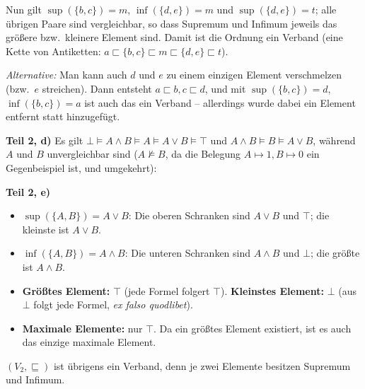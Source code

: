 \begin{loesung}
Nun gilt $\sup(\{b,c\})=m$, $\inf(\{d,e\})=m$ und $\sup(\{d,e\})=t$; alle übrigen Paare sind vergleichbar, so dass Supremum und Infimum jeweils das größere bzw.\ kleinere Element sind. Damit ist die Ordnung ein Verband (eine Kette von Antiketten: $a \sqsubset \{b,c\} \sqsubset m \sqsubset \{d,e\} \sqsubset t$).

\textit{Alternative:} Man kann auch $d$ und $e$ zu einem einzigen Element verschmelzen (bzw.\ $e$ streichen). Dann entsteht $a\sqsubset b,c\sqsubset d$, und mit $\sup(\{b,c\})=d$, $\inf(\{b,c\})=a$ ist auch das ein Verband -- allerdings wurde dabei ein Element entfernt statt hinzugefügt.

\medskip
\textbf{Teil 2, d)} Es gilt $\bot\models A\wedge B\models A\models A\vee B\models\top$ und $A\wedge B\models B\models A\vee B$, während $A$ und $B$ unvergleichbar sind ($A\not\models B$, da die Belegung $A\mapsto 1, B\mapsto 0$ ein Gegenbeispiel ist, und umgekehrt):

\begin{center}
\end{center}

\textbf{Teil 2, e)}
\begin{itemize}
  \item $\sup(\{A,B\}) = A\vee B$: Die oberen Schranken sind $A\vee B$ und $\top$; die kleinste ist $A\vee B$.
  \item $\inf(\{A,B\}) = A\wedge B$: Die unteren Schranken sind $A\wedge B$ und $\bot$; die größte ist $A\wedge B$.
  \item \textbf{Größtes Element:} $\top$ (jede Formel folgert $\top$). \textbf{Kleinstes Element:} $\bot$ (aus $\bot$ folgt jede Formel, \emph{ex falso quodlibet}).
  \item \textbf{Maximale Elemente:} nur $\top$. Da ein größtes Element existiert, ist es auch das einzige maximale Element.
\end{itemize}
$(V_2,\sqsubseteq)$ ist übrigens ein Verband, denn je zwei Elemente besitzen Supremum und Infimum.


\end{loesung}
